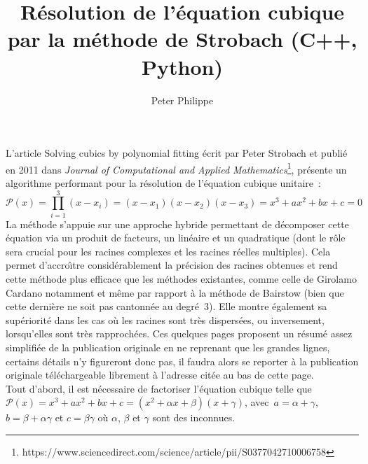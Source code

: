 \documentclass[11pt]{amsart}
\title{R\'esolution de l'\'equation cubique par la m\'ethode de Strobach (C++, Python)}
\author{Peter Philippe}
\newcommand{\ds}{\displaystyle}
\begin{document}
\maketitle

L'article \og Solving cubics by polynomial fitting \fg{} \'ecrit par Peter Strobach et publi\'e en 2011 dans \textit{Journal of Computational and Applied Mathematics}\footnote{https://www.sciencedirect.com/science/article/pii/S0377042710006758},
pr\'esente un algorithme performant pour la r\'esolution de l'\'equation cubique unitaire~:
$$\ds \mathcal{P}(x) = \prod_{i=1}^{3} (x-x_{i}) = (x-x_{1})(x-x_{2})(x-x_{3})= x^3 + ax^2 + bx + c = 0$$
La m\'ethode s'appuie sur une approche hybride permettant de d\'ecomposer cette \'equation via un produit de facteurs, un lin\'eaire et un quadratique (dont le
r\^ole sera crucial pour les racines complexes et les racines r\'eelles multiples). Cela permet d'accro\^{\i}tre consid\'erablement la pr\'ecision des racines
obtenues et rend cette m\'ethode plus efficace que les m\'ethodes existantes, comme celle de Girolamo Cardano notamment et m\^eme par rapport \`a la m\'ethode
de Bairstow (bien que cette derni\`ere ne soit pas cantonn\'ee au degr\'e~3). Elle montre \'egalement sa sup\'eriorit\'e dans les cas o\`u les racines sont tr\`es
dispers\'ees, ou inversement, lorsqu'elles sont tr\`es rapproch\'ees. Ces quelques pages proposent un r\'esum\'e assez simplifi\'ee de la publication originale
en ne reprenant que les grandes lignes, certains d\'etails n'y figureront donc pas, il faudra alors se reporter \`a la publication originale t\'el\'echargeable librement
\`a l'adresse cit\'ee au bas de cette page.\\

Tout d'abord, il est n\'ecessaire de factoriser l'\'equation cubique telle que~$\mathcal{P}(x) = x^3 + ax^2 + bx + c = (x^2 + \alpha{}x + \beta)(x+\gamma)$,
avec~$a = \alpha+\gamma$, $b = \beta + \alpha\gamma$ et $c = \beta \gamma$ o\`u $\alpha$, $\beta$ et $\gamma$ sont des inconnues.\\
\end{document}
